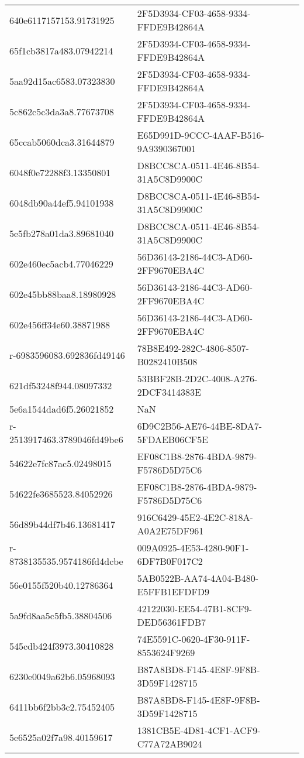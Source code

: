 \begin{tabular}{ll}
640e6117157153.91731925 & 2F5D3934-CF03-4658-9334-FFDE9B42864A \\
65f1cb3817a483.07942214 & 2F5D3934-CF03-4658-9334-FFDE9B42864A \\
5aa92d15ac6583.07323830 & 2F5D3934-CF03-4658-9334-FFDE9B42864A \\
5c862c5c3da3a8.77673708 & 2F5D3934-CF03-4658-9334-FFDE9B42864A \\
65ccab5060dca3.31644879 & E65D991D-9CCC-4AAF-B516-9A9390367001 \\
6048f0e72288f3.13350801 & D8BCC8CA-0511-4E46-8B54-31A5C8D9900C \\
6048db90a44ef5.94101938 & D8BCC8CA-0511-4E46-8B54-31A5C8D9900C \\
5e5fb278a01da3.89681040 & D8BCC8CA-0511-4E46-8B54-31A5C8D9900C \\
602e460ec5acb4.77046229 & 56D36143-2186-44C3-AD60-2FF9670EBA4C \\
602e45bb88baa8.18980928 & 56D36143-2186-44C3-AD60-2FF9670EBA4C \\
602e456ff34e60.38871988 & 56D36143-2186-44C3-AD60-2FF9670EBA4C \\
r-6983596083.692836fd49146 & 78B8E492-282C-4806-8507-B0282410B508 \\
621df53248f944.08097332 & 53BBF28B-2D2C-4008-A276-2DCF3414383E \\
5e6a1544dad6f5.26021852 & NaN \\
r-2513917463.3789046fd49be6 & 6D9C2B56-AE76-44BE-8DA7-5FDAEB06CF5E \\
54622e7fc87ac5.02498015 & EF08C1B8-2876-4BDA-9879-F5786D5D75C6 \\
54622fe3685523.84052926 & EF08C1B8-2876-4BDA-9879-F5786D5D75C6 \\
56d89b44df7b46.13681417 & 916C6429-45E2-4E2C-818A-A0A2E75DF961 \\
r-8738135535.9574186fd4dcbe & 009A0925-4E53-4280-90F1-6DF7B0F017C2 \\
56e0155f520b40.12786364 & 5AB0522B-AA74-4A04-B480-E5FFB1EFDFD9 \\
5a9fd8aa5c5fb5.38804506 & 42122030-EE54-47B1-8CF9-DED56361FDB7 \\
545cdb424f3973.30410828 & 74E5591C-0620-4F30-911F-8553624F9269 \\
6230e0049a62b6.05968093 & B87A8BD8-F145-4E8F-9F8B-3D59F1428715 \\
6411bb6f2bb3c2.75452405 & B87A8BD8-F145-4E8F-9F8B-3D59F1428715 \\
5e6525a02f7a98.40159617 & 1381CB5E-4D81-4CF1-ACF9-C77A72AB9024 \\

\end{tabular}
